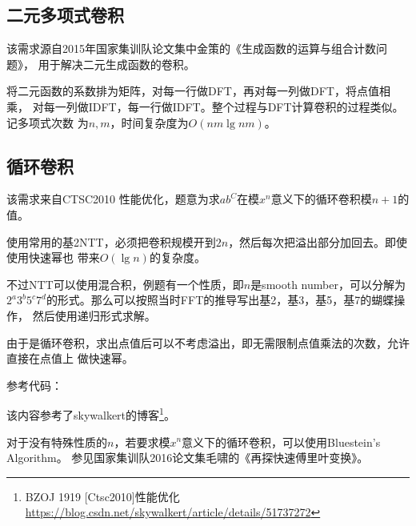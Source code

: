 \subsection{二元多项式卷积}
该需求源自2015年国家集训队论文集中金策的《生成函数的运算与组合计数问题》，
用于解决二元生成函数的卷积。

将二元函数的系数排为矩阵，对每一行做DFT，再对每一列做DFT，将点值相乘，
对每一列做IDFT，每一行做IDFT。整个过程与DFT计算卷积的过程类似。记多项式次数
为$n,m$，时间复杂度为$O(nm\lg nm)$。
\subsection{循环卷积}
该需求来自CTSC2010 性能优化，题意为求$ab^C$在模$x^n$意义下的循环卷积模$n+1$的值。

使用常用的基2NTT，必须把卷积规模开到$2n$，然后每次把溢出部分加回去。即使使用快速幂也
带来$O(\lg n)$的复杂度。

不过NTT可以使用混合积，例题有一个性质，即$n$是smooth number，可以分解为
$2^a3^b5^c7^d$的形式。那么可以按照当时FFT的推导写出基2，基3，基5，基7的蝴蝶操作，
然后使用递归形式求解。


由于是循环卷积，求出点值后可以不考虑溢出，即无需限制点值乘法的次数，允许直接在点值上
做快速幂。

参考代码：


该内容参考了skywalkert的博客\footnote{
    BZOJ 1919 [Ctsc2010]性能优化\\
    \url{https://blog.csdn.net/skywalkert/article/details/51737272}
}。

对于没有特殊性质的$n$，若要求模$x^n$意义下的循环卷积，可以使用Bluestein’s Algorithm。
参见国家集训队2016论文集毛啸的《再探快速傅里叶变换》。


